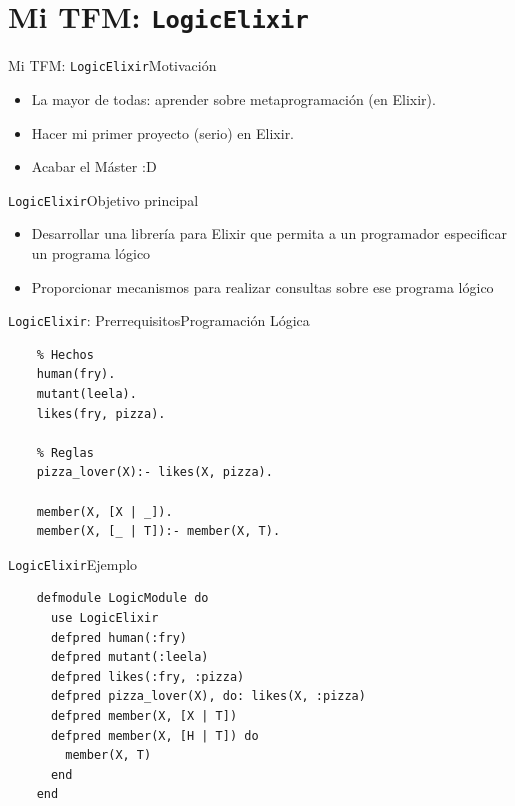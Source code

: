 \documentclass[14pt,aspectratio=169]{beamer}
\begin{document}
\section{Mi TFM: \texttt{LogicElixir}}
\begin{frame}{Mi TFM: \texttt{LogicElixir}}{Motivación}
  \begin{itemize}
    \item La mayor de todas: aprender sobre metaprogramación (en Elixir).
    \item Hacer mi primer proyecto (serio) en Elixir.
    \item Acabar el Máster :D
  \end{itemize}
\end{frame}

\begin{frame}{\texttt{LogicElixir}}{Objetivo principal}
  \begin{itemize}
    \item Desarrollar una librería para Elixir que permita
    a un programador especificar un programa lógico
    \item Proporcionar mecanismos para realizar consultas sobre
    ese programa lógico
  \end{itemize}
\end{frame}

\begin{frame}[fragile]{\texttt{LogicElixir}: Prerrequisitos}{Programación Lógica}
  \begin{verbatim}
    % Hechos
    human(fry).
    mutant(leela).
    likes(fry, pizza).

    % Reglas
    pizza_lover(X):- likes(X, pizza).

    member(X, [X | _]).
    member(X, [_ | T]):- member(X, T).

  \end{verbatim}
\end{frame}

\begin{frame}[fragile]{\texttt{LogicElixir}}{Ejemplo}
  \small \begin{verbatim}
    defmodule LogicModule do
      use LogicElixir
      defpred human(:fry)
      defpred mutant(:leela)
      defpred likes(:fry, :pizza)
      defpred pizza_lover(X), do: likes(X, :pizza)
      defpred member(X, [X | T])
      defpred member(X, [H | T]) do
        member(X, T)
      end
    end
  \end{verbatim}
\end{frame}
\end{document}
